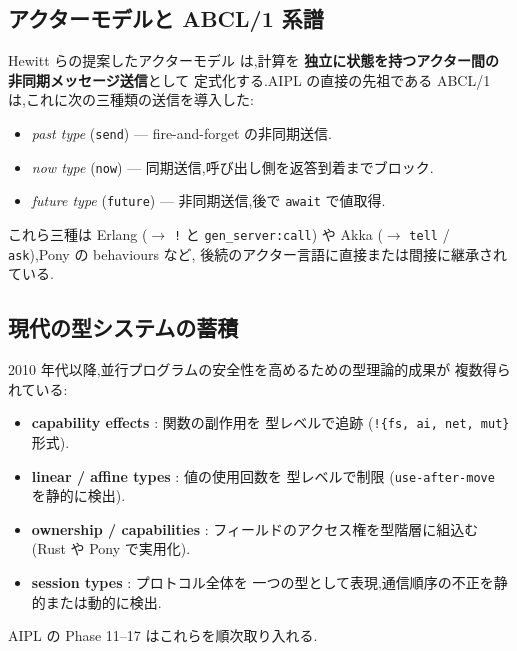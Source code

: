 \documentclass[11pt,a4paper]{article}
\newcommand{\code}[1]{\texttt{\small #1}}
\begin{document}
\subsection{アクターモデルと ABCL/1 系譜}

Hewitt らの提案したアクターモデル \cite{hewitt1973} は,計算を
\textbf{独立に状態を持つアクター間の非同期メッセージ送信}として
定式化する.AIPL の直接の先祖である ABCL/1 \cite{yonezawa1986abcl}
は,これに次の三種類の送信を導入した:

\begin{itemize}[leftmargin=*,itemsep=0pt]
  \item \emph{past type} (\code{send}) --- fire-and-forget の非同期送信.
  \item \emph{now type} (\code{now}) --- 同期送信,呼び出し側を返答到着までブロック.
  \item \emph{future type} (\code{future}) --- 非同期送信,後で \code{await} で値取得.
\end{itemize}

これら三種は Erlang ($\to$ \code{!} と \code{gen\_server:call}) や
Akka ($\to$ \code{tell} / \code{ask}),Pony の behaviours など,
後続のアクター言語に直接または間接に継承されている.

\subsection{現代の型システムの蓄積}

2010 年代以降,並行プログラムの安全性を高めるための型理論的成果が
複数得られている:

\begin{itemize}[leftmargin=*,itemsep=0pt]
  \item \textbf{capability effects} \cite{lucassen1988effect}: 関数の副作用を
    型レベルで追跡 (\code{!\{fs,~ai,~net,~mut\}} 形式).
  \item \textbf{linear / affine types} \cite{wadler1990linear}: 値の使用回数を
    型レベルで制限 (\code{use-after-move} を静的に検出).
  \item \textbf{ownership / capabilities} \cite{clarke2003ownership}:
    フィールドのアクセス権を型階層に組込む (Rust や Pony で実用化).
  \item \textbf{session types} \cite{honda1998session}: プロトコル全体を
    一つの型として表現,通信順序の不正を静的または動的に検出.
\end{itemize}

AIPL の Phase 11--17 はこれらを順次取り入れる.
\end{document}
